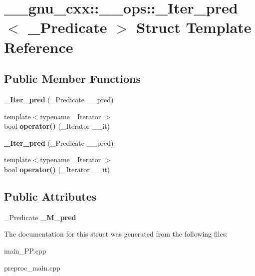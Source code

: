 \hypertarget{struct____gnu__cxx_1_1____ops_1_1__Iter__pred}{\section{\+\_\+\+\_\+gnu\+\_\+cxx\+:\+:\+\_\+\+\_\+ops\+:\+:\+\_\+\+Iter\+\_\+pred$<$ \+\_\+\+Predicate $>$ Struct Template Reference}
\label{struct____gnu__cxx_1_1____ops_1_1__Iter__pred}
}
\subsection*{Public Member Functions}
\begin{DoxyCompactItemize}
\item 
\hypertarget{struct____gnu__cxx_1_1____ops_1_1__Iter__pred_a5b8375afb07ed52f7cf284af410044be}{{\bfseries \+\_\+\+Iter\+\_\+pred} (\+\_\+\+Predicate \+\_\+\+\_\+pred)}\label{struct____gnu__cxx_1_1____ops_1_1__Iter__pred_a5b8375afb07ed52f7cf284af410044be}

\item 
\hypertarget{struct____gnu__cxx_1_1____ops_1_1__Iter__pred_a28a251cf8076844fd9b2d930e4390870}{{\footnotesize template$<$typename \+\_\+\+Iterator $>$ }\\bool {\bfseries operator()} (\+\_\+\+Iterator \+\_\+\+\_\+it)}\label{struct____gnu__cxx_1_1____ops_1_1__Iter__pred_a28a251cf8076844fd9b2d930e4390870}

\item 
\hypertarget{struct____gnu__cxx_1_1____ops_1_1__Iter__pred_a5b8375afb07ed52f7cf284af410044be}{{\bfseries \+\_\+\+Iter\+\_\+pred} (\+\_\+\+Predicate \+\_\+\+\_\+pred)}\label{struct____gnu__cxx_1_1____ops_1_1__Iter__pred_a5b8375afb07ed52f7cf284af410044be}

\item 
\hypertarget{struct____gnu__cxx_1_1____ops_1_1__Iter__pred_a28a251cf8076844fd9b2d930e4390870}{{\footnotesize template$<$typename \+\_\+\+Iterator $>$ }\\bool {\bfseries operator()} (\+\_\+\+Iterator \+\_\+\+\_\+it)}\label{struct____gnu__cxx_1_1____ops_1_1__Iter__pred_a28a251cf8076844fd9b2d930e4390870}

\end{DoxyCompactItemize}
\subsection*{Public Attributes}
\begin{DoxyCompactItemize}
\item 
\hypertarget{struct____gnu__cxx_1_1____ops_1_1__Iter__pred_a25e3774f33d4101247f8aa884a63d567}{\+\_\+\+Predicate {\bfseries \+\_\+\+M\+\_\+pred}}\label{struct____gnu__cxx_1_1____ops_1_1__Iter__pred_a25e3774f33d4101247f8aa884a63d567}

\end{DoxyCompactItemize}


The documentation for this struct was generated from the following files\+:\begin{DoxyCompactItemize}
\item 
main\+\_\+\+P\+P.\+cpp\item 
preproc\+\_\+main.\+cpp\end{DoxyCompactItemize}
